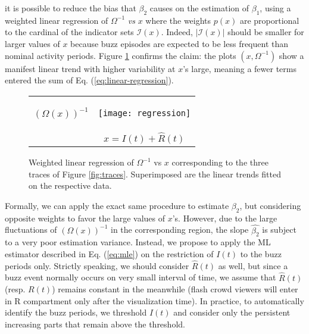 \documentclass[twoside]{article}
\newcommand{\roy}[2]{#2}
\begin{document}
it is possible to reduce the bias that  $\beta_2$ causes on the estimation of $\beta_1$, using a weighted linear regression of $\Omega^{-1}$ {\it vs} $x$ where the weights $p(x)$ are proportional to the cardinal of the 
indicator sets $\mathcal{I}(x)$. Indeed, $|\mathcal{I}(x)|$ should be smaller for larger values of $x$ because buzz episodes are expected to be less frequent than nominal activity periods. Figure \ref{fig:regression} confirms the claim:  the plots $(x,\Omega^{-1})$ show a manifest linear trend with higher variability at $x$'s large, meaning a fewer terms entered the sum of \roy{expression}{Eq.} (\ref{eq:linear-regression}).
\begin{figure}[h]
\centering
\hspace*{-3mm}\begin{tabular}{cc}
\begin{turn}{90}\hspace*{25mm} $(\Omega(x))^{-1}$ \end{turn}&
\hspace*{-2mm}\texttt{[image: regression]} \\[-1mm]
& $x = I(t)+\widehat{R}(t) $ \\
\end{tabular}
\caption{\small Weighted linear regression of $\Omega^{-1}$ vs $x$ corresponding to the three traces of Figure \ref{fig:traces}. Superimposed are the  linear trends fitted on the respective data.}
\label{fig:regression}
\end{figure}


Formally, we can apply the exact same procedure to estimate $\beta_2$, but considering opposite weights to favor 
the large values of $x$'s. However, due to the large fluctuations of $(\Omega(x))^{-1}$ in the corresponding region, the  slope $\widehat{\beta_2}$  is subject to a very poor estimation variance. Instead, we propose to apply the ML estimator \roy{}{described in Eq.} (\ref{eq:mle}) on the restriction of $I(t)$ to the buzz  periods only. Strictly speaking, we should consider $\widehat{R}(t)$ as well, but since a buzz event normally occurs on very small interval of time, we assume that  $\widehat{R}(t)$ (resp. $R(t)$) remains constant in the meanwhile (flash crowd viewers will enter in  R compartment only after the visualization time). In practice, to automatically identify the buzz periods, we threshold $I(t)$ and consider only the persistent increasing parts that remain above the threshold.\\
\end{document}
